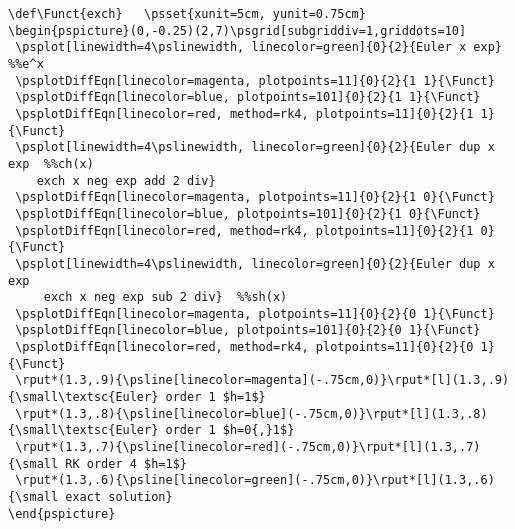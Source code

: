 \documentclass[11pt,english,BCOR10mm,DIV12,bibliography=totoc,parskip=false,smallheadings
    headexclude,footexclude,oneside]{pst-doc}
\begin{document}
\begin{lstlisting}[label={fig:minusexp},xrightmargin=-1.5cm]
\def\Funct{exch}   \psset{xunit=5cm, yunit=0.75cm}
\begin{pspicture}(0,-0.25)(2,7)\psgrid[subgriddiv=1,griddots=10]
 \psplot[linewidth=4\pslinewidth, linecolor=green]{0}{2}{Euler x exp}  %%e^x
 \psplotDiffEqn[linecolor=magenta, plotpoints=11]{0}{2}{1 1}{\Funct}
 \psplotDiffEqn[linecolor=blue, plotpoints=101]{0}{2}{1 1}{\Funct}
 \psplotDiffEqn[linecolor=red, method=rk4, plotpoints=11]{0}{2}{1 1}{\Funct}
 \psplot[linewidth=4\pslinewidth, linecolor=green]{0}{2}{Euler dup x exp  %%ch(x)
    exch x neg exp add 2 div}
 \psplotDiffEqn[linecolor=magenta, plotpoints=11]{0}{2}{1 0}{\Funct}
 \psplotDiffEqn[linecolor=blue, plotpoints=101]{0}{2}{1 0}{\Funct}
 \psplotDiffEqn[linecolor=red, method=rk4, plotpoints=11]{0}{2}{1 0}{\Funct}
 \psplot[linewidth=4\pslinewidth, linecolor=green]{0}{2}{Euler dup x exp
     exch x neg exp sub 2 div}  %%sh(x)
 \psplotDiffEqn[linecolor=magenta, plotpoints=11]{0}{2}{0 1}{\Funct}
 \psplotDiffEqn[linecolor=blue, plotpoints=101]{0}{2}{0 1}{\Funct}
 \psplotDiffEqn[linecolor=red, method=rk4, plotpoints=11]{0}{2}{0 1}{\Funct}
 \rput*(1.3,.9){\psline[linecolor=magenta](-.75cm,0)}\rput*[l](1.3,.9){\small\textsc{Euler} order 1 $h=1$}
 \rput*(1.3,.8){\psline[linecolor=blue](-.75cm,0)}\rput*[l](1.3,.8){\small\textsc{Euler} order 1 $h=0{,}1$}
 \rput*(1.3,.7){\psline[linecolor=red](-.75cm,0)}\rput*[l](1.3,.7){\small RK order 4 $h=1$}
 \rput*(1.3,.6){\psline[linecolor=green](-.75cm,0)}\rput*[l](1.3,.6){\small exact solution}
\end{pspicture}
\end{lstlisting}

\clearpage
\end{document}
